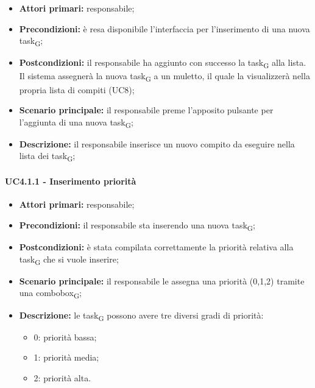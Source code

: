 \begin{itemize}
	\item 	\textbf{Attori primari:} responsabile;
	\item 	\textbf{Precondizioni:} è resa disponibile l'interfaccia per l'inserimento di una nuova task\textsubscript{G}; 
	\item 	\textbf{Postcondizioni:} il responsabile ha aggiunto con successo la task\textsubscript{G} alla lista. Il sistema assegnerà la nuova task\textsubscript{G} a un muletto, il quale la visualizzerà nella propria lista di compiti (UC8);
	\item 	\textbf{Scenario principale:} il responsabile preme l'apposito pulsante per l'aggiunta di una nuova task\textsubscript{G}; 
	\item 	\textbf{Descrizione:} il responsabile inserisce un nuovo compito da eseguire nella lista dei task\textsubscript{G};
\end{itemize}

\paragraph{UC4.1.1 - Inserimento priorità}
\begin{itemize}
	\item 	\textbf{Attori primari:} responsabile;
	\item 	\textbf{Precondizioni:} il responsabile sta inserendo una nuova task\textsubscript{G};
	\item 	\textbf{Postcondizioni:} è stata compilata correttamente la priorità relativa alla task\textsubscript{G} che si vuole inserire;
	\item 	\textbf{Scenario principale:} il responsabile le assegna una priorità (0,1,2) tramite una combobox\textsubscript{G};
	\item 	\textbf{Descrizione:} le task\textsubscript{G} possono avere tre diversi gradi di priorità:
	\begin{itemize}
		\item 0: priorità bassa;
		\item 1: priorità media;
		\item 2: priorità alta.
	\end{itemize}
\end{itemize}

